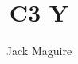 \documentclass{article}
\title{\huge{C3 Y}}
\author{\huge{Jack Maguire}}
\date{}
\begin{document}
	
\maketitle

\qs{
	
}
	
\end{document}

